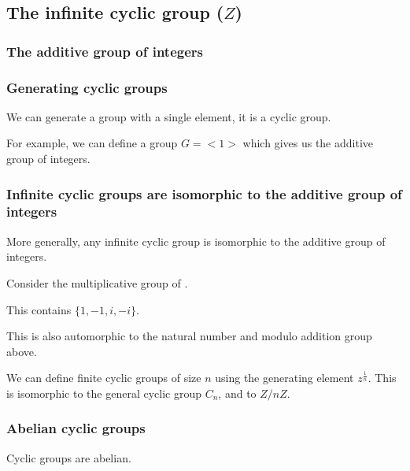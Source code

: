 
\subsection{The infinite cyclic group (\(Z\))}

\subsubsection{The additive group of integers}

\subsubsection{Generating cyclic groups}

We can generate a group with a single element, it is a cyclic group.

For example, we can define a group \(G=<1>\) which gives us the additive group of integers.

\subsubsection{Infinite cyclic groups are isomorphic to the additive group of integers}

More generally, any infinite cyclic group is isomorphic to the additive group of integers.

Consider the multiplicative group of \(< i >\).

This contains \(\{1,-1,i,-i \} \).

This is also automorphic to the natural number and modulo addition group above.

We can define finite cyclic groups of size \(n\) using the generating element \(z^{\frac{1}{n}}\). This is isomorphic to the general cyclic group \(C_n\), and to \(Z/nZ\).

\subsubsection{Abelian cyclic groups}

Cyclic groups are abelian.


